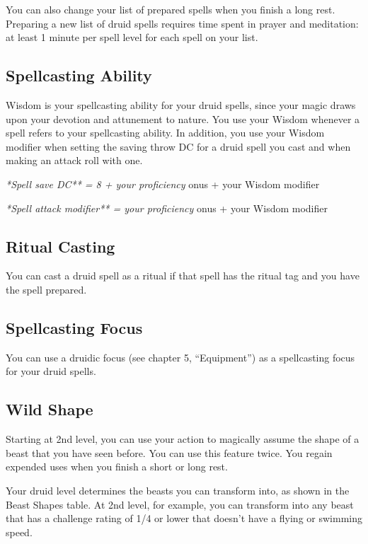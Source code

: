 You can also change your list of prepared spells when you finish a long rest. Preparing a new list of druid spells requires time spent in prayer and meditation: at least 1 minute per spell level for each spell on your list.

\subsection{Spellcasting Ability}

Wisdom is your spellcasting ability for your druid spells, since your magic draws upon your devotion and attunement to nature. You use your Wisdom whenever a spell refers to your spellcasting ability. In addition, you use your Wisdom modifier when setting the saving throw DC for a druid spell you cast and when making an attack roll with one.

\textit{*Spell save DC** = 8 + your proficiency }onus + your Wisdom modifier

\textit{*Spell attack modifier** = your proficiency }onus + your Wisdom modifier

\subsection{Ritual Casting}

You can cast a druid spell as a ritual if that spell has the ritual tag and you have the spell prepared.

\subsection{Spellcasting Focus}

You can use a druidic focus (see chapter 5, “Equipment”) as a spellcasting focus for your druid spells.

\subsection{Wild Shape}

Starting at 2nd level, you can use your action to magically assume the shape of a beast that you have seen before. You can use this feature twice. You regain expended uses when you finish a short or long rest.

Your druid level determines the beasts you can transform into, as shown in the Beast Shapes table. At 2nd level, for example, you can transform into any beast that has a challenge rating of 1/4 or lower that doesn’t have a flying or swimming speed.

